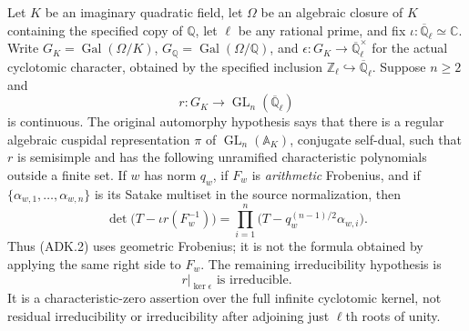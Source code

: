 Let $K$ be an imaginary quadratic field, let $\Omega$ be an algebraic
closure of $K$ containing the specified copy of $\mathbb Q$, let $\ell$
be any rational prime, and fix
$\iota:\overline{\mathbb Q}_{\ell}\simeq\mathbb C$.
Write $G_K=\operatorname{Gal}(\Omega/K)$,
$G_{\mathbb Q}=\operatorname{Gal}(\Omega/\mathbb Q)$, and
$\epsilon:G_K\to\overline{\mathbb Q}_{\ell}^{\times}$ for the actual
cyclotomic character, obtained by the specified inclusion
$\mathbb Z_\ell\hookrightarrow\overline{\mathbb Q}_\ell$.
Suppose $n\ge2$ and
\[
 r:G_K\longrightarrow\operatorname{GL}_n(\overline{\mathbb Q}_\ell)
 \tag{ADK.1}
\]
is continuous.  The original automorphy hypothesis says that there is
a regular algebraic cuspidal representation $\pi$ of
$\operatorname{GL}_n(\mathbb A_K)$, conjugate self-dual, such that $r$
is semisimple and has the following unramified characteristic
polynomials outside a finite set.  If $w$ has norm $q_w$, if $F_w$ is
\emph{arithmetic} Frobenius, and if
$\{\alpha_{w,1},\ldots,\alpha_{w,n}\}$ is its Satake multiset in the
source normalization, then
\[
 \det\bigl(T-\iota r(F_w^{-1})\bigr)
 =\prod_{i=1}^{n}
   \bigl(T-q_w^{(n-1)/2}\alpha_{w,i}\bigr).
 \tag{ADK.2}
\]
Thus (ADK.2) uses geometric Frobenius; it is not the formula obtained
by applying the same right side to $F_w$.
The remaining irreducibility hypothesis is
\[
                       r|_{\ker\epsilon}\text{ is irreducible}.
 \tag{ADK.3}
\]
It is a characteristic-zero assertion over the full infinite
cyclotomic kernel, not residual irreducibility or irreducibility after
adjoining just $\ell$th roots of unity.

